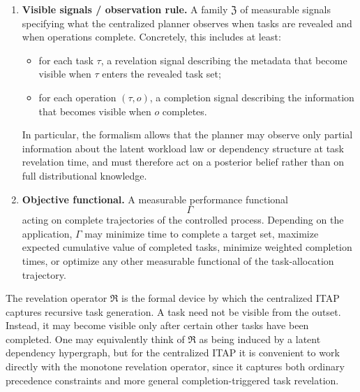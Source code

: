\begin{definition}
\begin{enumerate}
    This map encodes:
    \begin{itemize}
        \item heterogeneity of agent capabilities;
        \item redundancy or collaboration, since \(|S|\) may exceed \(1\);
        \item state dependence of task difficulty through the dependence on \(C\).
    \end{itemize}

    We require \(\rho_{\tau,o}(\varnothing,C,\vartheta)=0\) for all \(\tau,o,C,\vartheta\).

    \item \textbf{Visible signals / observation rule.}  
    A family \(\mathfrak Z\) of measurable signals specifying what the centralized planner observes when tasks are revealed and when operations complete. Concretely, this includes at least:
    \begin{itemize}
        \item for each task \(\tau\), a revelation signal describing the metadata that become visible when \(\tau\) enters the revealed task set;
        \item for each operation \((\tau,o)\), a completion signal describing the information that becomes visible when \(o\) completes.
    \end{itemize}
    In particular, the formalism allows that the planner may observe only partial information about the latent workload law or dependency structure at task revelation time, and must therefore act on a posterior belief rather than on full distributional knowledge.

    \item \textbf{Objective functional.}  
    A measurable performance functional
    \[
    \Gamma
    \]
    acting on complete trajectories of the controlled process. Depending on the application, \(\Gamma\) may minimize time to complete a target set, maximize expected cumulative value of completed tasks, minimize weighted completion times, or optimize any other measurable functional of the task-allocation trajectory.
\end{enumerate}
\end{definition}

\begin{remark}
The revelation operator \(\mathfrak R\) is the formal device by which the centralized ITAP captures recursive task generation. A task need not be visible from the outset. Instead, it may become visible only after certain other tasks have been completed. One may equivalently think of \(\mathfrak R\) as being induced by a latent dependency hypergraph, but for the centralized ITAP it is convenient to work directly with the monotone revelation operator, since it captures both ordinary precedence constraints and more general completion-triggered task revelation.
\end{remark}

